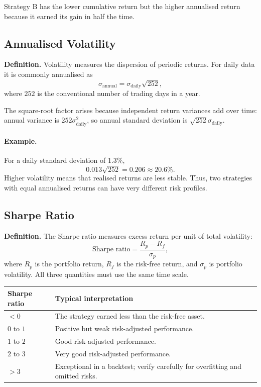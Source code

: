 \documentclass[12pt,openany]{book}
\theoremstyle{definition}
\theoremstyle{remark}
\begin{document}
Strategy B has the lower cumulative return but the higher annualised return
because it earned its gain in half the time.

\subsection{Annualised Volatility}

\textbf{Definition.} Volatility measures the dispersion of periodic returns.
For daily data it is commonly annualised as
\[
\sigma_{\mathrm{annual}}=\sigma_{\mathrm{daily}}\sqrt{252},
\]
where \(252\) is the conventional number of trading days in a year.

The square-root factor arises because independent return variances add over
time: annual variance is \(252\sigma_{\mathrm{daily}}^2\), so annual standard
deviation is \(\sqrt{252}\sigma_{\mathrm{daily}}\).

\paragraph{Example.}
For a daily standard deviation of \(1.3\%\),
\[
0.013\sqrt{252}=0.206\approx\mathbf{20.6\%}.
\]
Higher volatility means that realised returns are less stable. Thus, two
strategies with equal annualised returns can have very different risk
profiles.

\subsection{Sharpe Ratio}

\textbf{Definition.} The Sharpe ratio measures excess return per unit of
total volatility:
\[
\text{Sharpe ratio}=\frac{R_p-R_f}{\sigma_p},
\]
where \(R_p\) is the portfolio return, \(R_f\) is the risk-free return, and
\(\sigma_p\) is portfolio volatility. All three quantities must use the same
time scale.

\begin{center}
\small
\begin{tabular}{|L{0.20\textwidth}|L{0.65\textwidth}|}
\hline
\textbf{Sharpe ratio} & \textbf{Typical interpretation} \\ \hline
\(<0\) & The strategy earned less than the risk-free asset. \\ \hline
\(0\) to \(1\) & Positive but weak risk-adjusted performance. \\ \hline
\(1\) to \(2\) & Good risk-adjusted performance. \\ \hline
\(2\) to \(3\) & Very good risk-adjusted performance. \\ \hline
\(>3\) & Exceptional in a backtest; verify carefully for overfitting and omitted risks. \\ \hline
\end{tabular}
\end{center}
\end{document}
